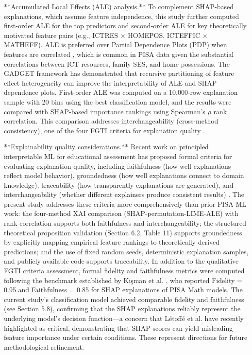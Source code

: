\documentclass[pdflatex,sn-mathphys-ay]{sn-jnl}
\begin{document}
**Accumulated Local Effects (ALE) analysis.** To complement SHAP-based explanations, which assume feature independence, this study further computed first-order ALE for the top predictors and second-order ALE for key theoretically motivated feature pairs (e.g., ICTRES × HOMEPOS, ICTEFFIC × MATHEFF). ALE is preferred over Partial Dependence Plots (PDP) when features are correlated \citep{Molnar_2022}, which is common in PISA data given the substantial correlations between ICT resources, family SES, and home possessions. The GADGET framework \citep{Herbinger_2024_GADGET} has demonstrated that recursive partitioning of feature effect heterogeneity can improve the interpretability of ALE and SHAP dependence plots. First-order ALE was computed on a 10,000-row explanation sample with 20 bins using the best classification model, and the results were compared with SHAP-based importance rankings using Spearman's $\rho$ rank correlation. This comparison addresses interchangeability (cross-method consistency), one of the four FGTI criteria for explanation quality \citep{Kim_2025_FGTI}.

**Explainability quality considerations.** Recent work on principled interpretable ML for educational assessment has proposed formal criteria for evaluating explanation quality, including faithfulness (how well explanations reflect model behavior), groundedness (how well explanations connect to domain knowledge), traceability (how transparently explanations are generated), and interchangeability (whether different explainers produce consistent results) \citep{Kim_2025_FGTI}. The present study addresses these criteria more comprehensively than prior PISA-ML work: the four-method XAI comparison (SHAP-permutation-LIME-ALE) with rank correlation supports both faithfulness and interchangeability; the structured theoretical proposition validation (Section 6.2, Table 11) supports groundedness by explicitly mapping empirical feature rankings to theoretically derived predictions; and the use of fixed random seeds, deterministic explanation samples, and publicly available code supports traceability. In addition to the qualitative FGTI criteria assessment, formal fidelity and faithfulness metrics were computed following the benchmark established by Kişman et al. \citep{Kisman_2026}, who reported Fidelity = 0.95 and Faithfulness = 0.85 for SHAP explanations of PISA Math models. The current study's classification model achieved comparable fidelity and faithfulness (see Section 5.8), confirming that the SHAP explanations reliably represent the underlying model's decision function---a concern that Létoffé et al. \citep{Letoffe_2026_rigorous_xai} have recently highlighted as critical, demonstrating that SHAP scores can yield misleading feature importance under certain conditions. These represent directions for future methodological refinement.
\end{document}
